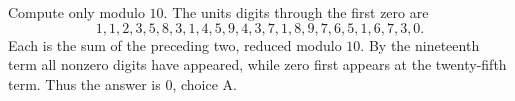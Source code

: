 Compute only modulo $10$. The units digits through the first zero are
\[
1,1,2,3,5,8,3,1,4,5,9,4,3,7,1,8,9,7,6,5,1,6,7,3,0.
\]
Each is the sum of the preceding two, reduced modulo $10$. By the nineteenth term all nonzero digits have appeared, while zero first appears at the twenty-fifth term. Thus the answer is $\boxed0$, choice $\boxed{\text{A}}$.
